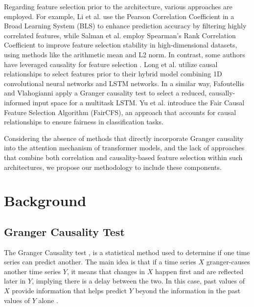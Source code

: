 \documentclass[acmsmall]{acmart}
\begin{document}
Regarding feature selection prior to the architecture, various approaches are employed. For example, Li et al. \cite{li2022pearson} use the Pearson Correlation Coefficient in a Broad Learning System (BLS) to enhance prediction accuracy by filtering highly correlated features, while Salman et al. \cite{salman2022stability} employ Spearman's Rank Correlation Coefficient to improve feature selection stability in high-dimensional datasets, using methods like the arithmetic mean and L2 norm. In contrast, some authors have leveraged causality for feature selection \cite{yu2020causality}. Long et al. \cite{long2021air} utilize causal relationships to select features prior to their hybrid model combining 1D convolutional neural networks and LSTM networks. {\color{black}In a similar way, Fafoutellis and Vlahogianni \cite{fafoutellis2025theory} apply a Granger causality test to select a reduced, causally-informed input space for a multitask LSTM.} Yu et al. \cite{ling2024fair} introduce the Fair Causal Feature Selection Algorithm (FairCFS), an approach that accounts for causal relationships to ensure fairness in classification tasks.  %

Considering the absence of methods that directly incorporate Granger causality into the attention mechanism of transformer models, and the lack of approaches that combine both correlation and causality-based feature selection within such architectures, we propose our methodology to include these components. 



\section{Background} \label{sec:preliminaries}


\subsection{Granger Causality Test}
The Granger Causality test \cite{granger1969investigating}, is a statistical method used to determine if one time series can predict another. The main idea is that if a time series $X$ granger-causes another time series $Y$, it means that changes in $X$ happen first and are reflected later in $Y$, implying there is a delay between the two. In this case, past values of $X$ provide information that helps predict $Y$ beyond the information in the past values of $Y$ alone \cite{papaspyropoulos2024validity}.
\end{document}
